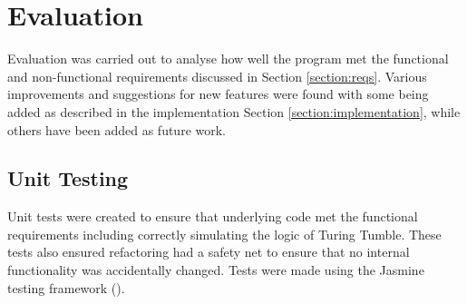 \documentclass{l4proj}
\begin{document}
\chapter{Evaluation}
\label{section:evaluation}
Evaluation was carried out to analyse how well the program met the functional and non-functional requirements discussed in Section \ref{section:reqs}. Various improvements and suggestions for new features were found with some being added as described in the implementation Section \ref{section:implementation}, while others have been added as future work. 

\section{Unit Testing}
Unit tests were created to ensure that underlying code met the functional requirements including correctly simulating the logic of Turing Tumble. These tests also ensured refactoring had a safety net to ensure that no internal functionality was accidentally changed. Tests were made using the Jasmine testing framework (\cite{jasmine}). 

\end{document}
